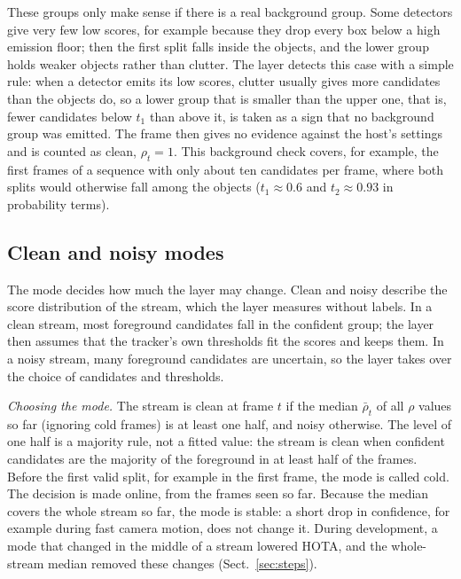 These groups only make sense if there is a real background group. Some
detectors give very few low scores, for example because they drop every box
below a high emission floor; then the first split falls inside the objects,
and the lower group holds weaker objects rather than clutter. The layer
detects this case with a simple rule: when a detector emits its low
scores, clutter usually gives more candidates than the objects do, so a lower
group that is smaller than the upper one, that is, fewer candidates below
$t_1$ than above it, is taken as a sign that no background group was emitted.
The frame then gives no evidence against the host's settings and is counted
as clean, $\rho_t=1$. This background
check covers, for example, the first frames of a sequence with only about
ten candidates per frame, where both splits would otherwise fall among the
objects ($t_1\approx0.6$ and $t_2\approx0.93$ in probability terms).

\subsection{Clean and noisy modes}\label{sec:regimes}
The mode decides how much the layer may change. Clean and noisy describe the
score distribution of the stream, which the layer measures without labels. In a
clean stream, most foreground candidates fall in the confident group; the
layer then assumes that the tracker's own thresholds fit the scores and keeps
them. In a noisy stream, many foreground candidates are uncertain, so the
layer takes over the choice of candidates and thresholds.

\emph{Choosing the mode.} The stream is clean at frame $t$ if the median
$\bar\rho_t$ of all $\rho$ values so far (ignoring cold frames) is at least
one half, and noisy otherwise. The level of one half is a majority rule, not
a fitted value: the stream is clean when confident candidates are the
majority of the foreground in at least half of the frames. Before the first valid split, for
example in the first frame, the mode is called cold. The decision is made
online, from the frames seen so far. Because the median covers the whole
stream so far, the mode is stable: a short drop in confidence, for example
during fast camera motion, does not change it. During development, a mode
that changed in the middle of a stream lowered HOTA, and the whole-stream
median removed these changes (Sect.~\ref{sec:steps}).

